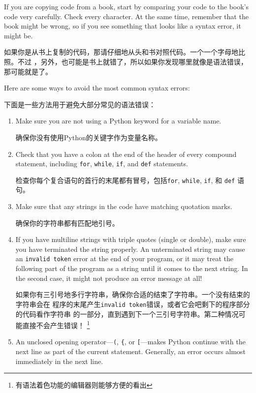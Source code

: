 \documentclass[10pt]{book}
\begin{document}
\begin{CJK}{UTF8}{gbsn}
If you are copying code from a book, start by comparing
your code to the book's code very carefully.  Check every character.
At the same time, remember that the book might be wrong, so
if you see something that looks like a syntax error, it might be.

如果你是从书上复制的代码，那请仔细地从头和书对照代码。一个一个字母地比照。不过
，另外，也可能是书上就错了，所以如果你发现哪里就像是语法错误，那可能就是了。

Here are some ways to avoid the most common syntax errors:

下面是一些方法用于避免大部分常见的语法错误：

\begin{enumerate}

\item Make sure you are not using a Python keyword for a variable name.

确保你没有使用Python的关键字作为变量名称。

\item Check that you have a colon at the end of the header of every
compound statement, including {\tt for}, {\tt while},
{\tt if}, and {\tt def} statements.

检查你每个复合语句的首行的末尾都有冒号，包括{\tt for}, {\tt while},
{\tt if}, 和 {\tt def} 语句。

\item Make sure that any strings in the code have matching
quotation marks.

确保你的字符串都有匹配地引号。

\item If you have multiline strings with triple quotes (single or double), make
sure you have terminated the string properly.  An unterminated string
may cause an {\tt invalid token} error at the end of your program,
or it may treat the following part of the program as a string until it
comes to the next string.  In the second case, it might not produce an error
message at all!

如果你有三引号地多行字符串，确保你合适的结束了字符串。一个没有结束的字符串会在
程序的末尾产生{\tt invalid token}错误，或者它会吧剩下的程序部分的代码看作字符串
的一部分，直到遇到下一个三引号字符串。第二种情况可能直接不会产生错误！
\footnote{有语法着色功能的编辑器则能够方便的看出}

\item An unclosed opening operator---\verb+(+, \verb+{+, or
  \verb+[+---makes Python continue with the next line as part of the
  current statement.  Generally, an error occurs almost immediately in
  the next line.


\end{enumerate}
\end{CJK}
\end{document}

